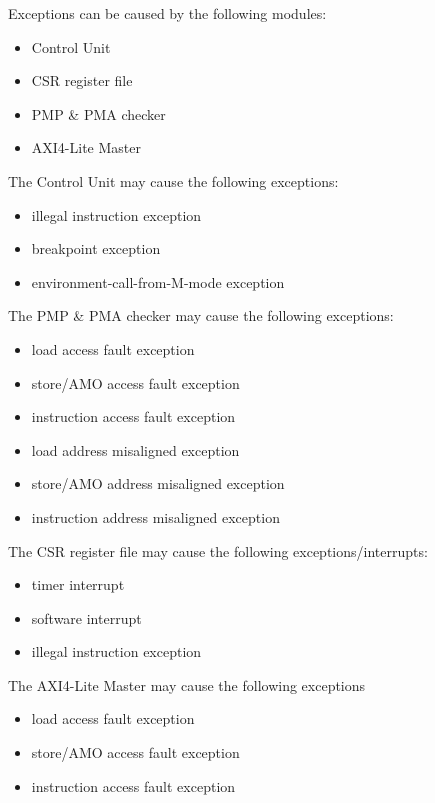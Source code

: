 Exceptions can be caused by the following modules:
\begin{itemize}
	\item Control Unit
	\item \ac{CSR} register file
	\item \ac{PMP} \& \ac{PMA} checker
	\item \ac{AXI4-Lite} Master
\end{itemize}


The Control Unit may cause the following exceptions:
\begin{itemize}
	\item illegal instruction exception
	\item breakpoint exception
	\item environment-call-from-M-mode exception
\end{itemize}

The \ac{PMP} \& \ac{PMA} checker may cause the following exceptions:
\begin{itemize}
	\item load access fault exception
	\item store/\ac{AMO} access fault exception
	\item instruction access fault exception
	\item load address misaligned exception
	\item store/\ac{AMO} address misaligned exception
	\item instruction address misaligned exception
\end{itemize}

The \ac{CSR} register file may cause the following exceptions/interrupts:
\begin{itemize}
	\item timer interrupt
	\item software interrupt
	\item illegal instruction exception
\end{itemize}

The \ac{AXI4-Lite} Master may cause the following exceptions
\begin{itemize}
	\item load access fault exception
	\item store/\ac{AMO} access fault exception
	\item instruction access fault exception
\end{itemize}

